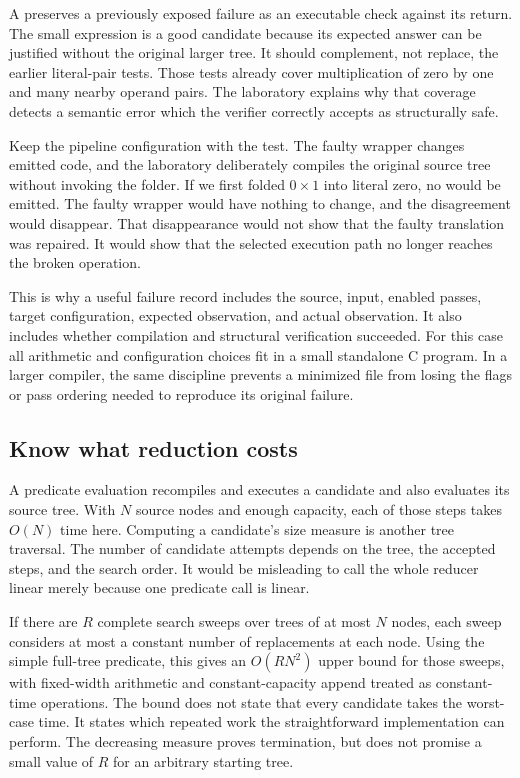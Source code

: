 A  preserves a previously exposed failure as an executable check against its return.
The small expression is a good candidate because its expected answer can be justified without the original larger tree.
It should complement, not replace, the earlier literal-pair tests.
Those tests already cover multiplication of zero by one and many nearby operand pairs.
The laboratory explains why that coverage detects a semantic error which the verifier correctly accepts as structurally safe.

Keep the pipeline configuration with the test.
The faulty wrapper changes emitted code, and the laboratory deliberately compiles the original source tree without invoking the folder.
If we first folded $0\times1$ into literal zero, no  would be emitted.
The faulty wrapper would have nothing to change, and the disagreement would disappear.
That disappearance would not show that the faulty translation was repaired.
It would show that the selected execution path no longer reaches the broken operation.

This is why a useful failure record includes the source, input, enabled passes, target configuration, expected observation, and actual observation.
It also includes whether compilation and structural verification succeeded.
For this case all arithmetic and configuration choices fit in a small standalone C program.
In a larger compiler, the same discipline prevents a minimized file from losing the flags or pass ordering needed to reproduce its original failure.

\subsection{Know what reduction costs}
\label{sec:tiny-reduction-cost}

A predicate evaluation recompiles and executes a candidate and also evaluates its source tree.
With $N$ source nodes and enough capacity, each of those steps takes $O(N)$ time here.
Computing a candidate's size measure is another tree traversal.
The number of candidate attempts depends on the tree, the accepted steps, and the search order.
It would be misleading to call the whole reducer linear merely because one predicate call is linear.

If there are $R$ complete search sweeps over trees of at most $N$ nodes, each sweep considers at most a constant number of replacements at each node.
Using the simple full-tree predicate, this gives an $O(RN^2)$ upper bound for those sweeps, with fixed-width arithmetic and constant-capacity append treated as constant-time operations.
The bound does not state that every candidate takes the worst-case time.
It states which repeated work the straightforward implementation can perform.
The decreasing measure proves termination, but does not promise a small value of $R$ for an arbitrary starting tree.

